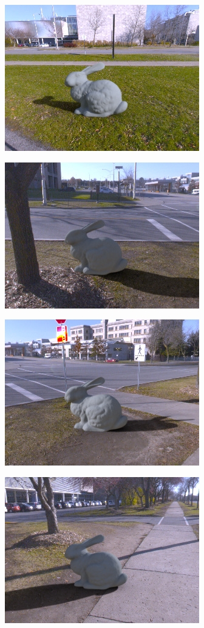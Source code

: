 \begin{minipage}{\linewidth}
\begin{multicols}{4}
\includegraphics[width=\mywidth]{AG8A2833_Panorama_hdr-corrected_002.jpg}

\includegraphics[width=\mywidth]{AG8A2875_Panorama_hdr-corrected_011.jpg}

\includegraphics[width=\mywidth]{AG8A2875_Panorama_hdr-corrected_009.jpg}

\includegraphics[width=\mywidth]{AG8A2875_Panorama_hdr-corrected_004.jpg}


\end{multicols}
\end{minipage}

